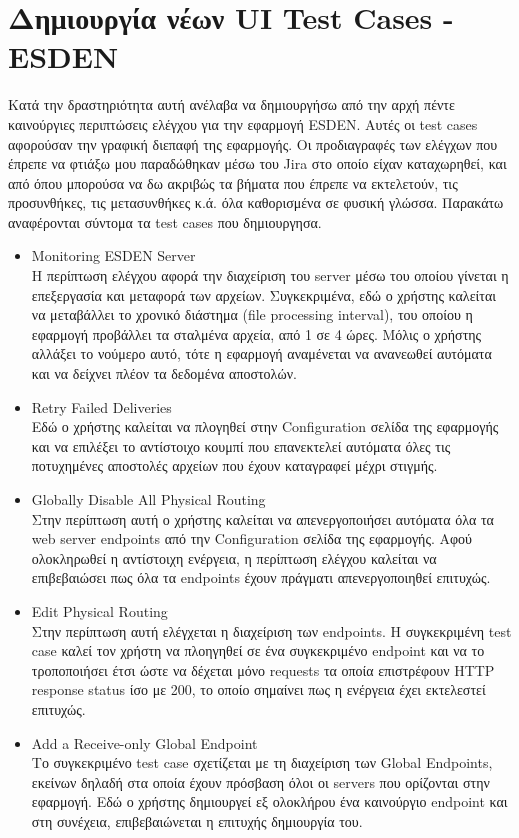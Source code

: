 \section*{Δημιουργία νέων UI Test Cases - ESDEN}
Κατά την δραστηριότητα αυτή ανέλαβα να δημιουργήσω από την αρχή πέντε καινούργιες περιπτώσεις ελέγχου για την εφαρμογή ESDEN. Αυτές οι test cases 
αφορούσαν την γραφική διεπαφή της εφαρμογής. Οι προδιαγραφές των ελέγχων που έπρεπε να φτιάξω μου παραδώθηκαν μέσω του Jira στο οποίο είχαν καταχωρηθεί,  
και από όπου μπορούσα να δω ακριβώς τα βήματα που έπρεπε να εκτελετούν, τις προσυνθήκες, τις μετασυνθήκες κ.ά. όλα καθορισμένα σε φυσική γλώσσα. 
Παρακάτω αναφέρονται σύντομα τα test cases που δημιουργησα. 
\begin{itemize}
    \item Monitoring ESDEN Server\\ Η περίπτωση ελέγχου αφορά την διαχείριση του server μέσω του οποίου γίνεται η επεξεργασία και μεταφορά των αρχείων. 
    Συγκεκριμένα, εδώ ο χρήστης καλείται να μεταβάλλει το χρονικό διάστημα (file processing interval), του οποίου η εφαρμογή προβάλλει τα σταλμένα αρχεία, 
    από 1 σε 4 ώρες. Μόλις ο χρήστης αλλάξει το νούμερο αυτό, τότε η εφαρμογή αναμένεται να ανανεωθεί αυτόματα και να δείχνει πλέον τα δεδομένα αποστολών.
    \item Retry Failed Deliveries\\ Εδώ ο χρήστης καλείται να πλογηθεί στην Configuration σελίδα της εφαρμογής και να επιλέξει το αντίστοιχο κουμπί που 
    επανεκτελεί αυτόματα όλες τις ποτυχημένες αποστολές αρχείων που έχουν καταγραφεί μέχρι στιγμής.
	\item Globally Disable All Physical Routing\\ Στην περίπτωση αυτή ο χρήστης καλείται να απενεργοποιήσει αυτόματα όλα τα web server endpoints από την 
    Configuration σελίδα της εφαρμογής. Αφού ολοκληρωθεί η αντίστοιχη ενέργεια, η περίπτωση ελέγχου καλείται να επιβεβαιώσει πως όλα τα endpoints έχουν 
    πράγματι απενεργοποιηθεί επιτυχώς.
	\item Edit Physical Routing\\ Στην περίπτωση αυτή ελέγχεται η διαχείριση των endpoints. Η συγκεκριμένη test case καλεί τον χρήστη να πλοηγηθεί σε ένα
     συγκεκριμένο endpoint και να το τροποποιήσει έτσι ώστε να δέχεται μόνο requests τα οποία επιστρέφουν HTTP response status ίσο με 200, το οποίο σημαίνει 
     πως η ενέργεια έχει εκτελεστεί επιτυχώς.
    \item Add a Receive-only Global Endpoint\\ Το συγκεκριμένο test case σχετίζεται με τη διαχείριση των Global Endpoints, εκείνων δηλαδή στα οποία έχουν πρόσβαση 
    όλοι οι servers που ορίζονται στην εφαρμογή. Εδώ ο χρήστης δημιουργεί εξ ολοκλήρου ένα καινούργιο endpoint και στη συνέχεια, επιβεβαιώνεται η επιτυχής δημιουργία του.
\end{itemize}
